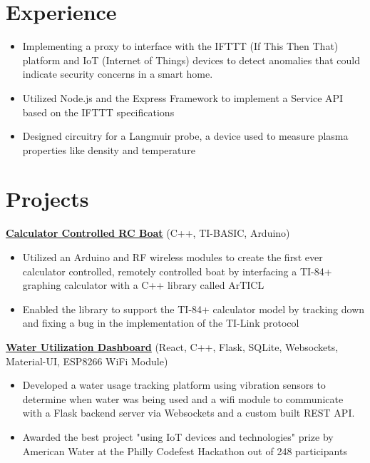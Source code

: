\documentclass{article}
\begin{document}
\section{Experience}
\begin{itemize}
    \item Implementing a proxy to interface with the IFTTT (If This Then That) platform and IoT (Internet of Things) devices to detect anomalies that could indicate security concerns in a smart home.
    \item Utilized Node.js and the Express Framework to implement a Service API based on the IFTTT specifications
\end{itemize}
\begin{itemize}
    \item Designed circuitry for a Langmuir probe, a device used to measure plasma properties like density and temperature
\end{itemize}

\section{Projects}

\textbf{\href{https://github.com/jshin313/CalcControlledBoat}{\underline{Calculator Controlled RC Boat}}} \hfill (C++, TI-BASIC, Arduino)
\begin{itemize}
    \item Utilized an Arduino and RF wireless modules to create the first ever calculator controlled, remotely controlled boat by interfacing a TI-84+ graphing calculator with a C++ library called ArTICL
    \item Enabled the library to support the TI-84+ calculator model by tracking down and fixing a bug in the implementation of the TI-Link protocol
\end{itemize}

\textbf{\href{https://github.com/jshin313/AquaQuant}{\underline{Water Utilization Dashboard}}} \hfill (React, C++, Flask, SQLite, Websockets, Material-UI, ESP8266 WiFi Module)
\begin{itemize}
    \item Developed a water usage tracking platform using vibration sensors to determine when water was being used and a wifi module to communicate with a Flask backend server via Websockets and a custom built REST API.
    \item Awarded the best project "using IoT devices and technologies" prize by American Water at the Philly Codefest Hackathon out of 248 participants
\end{itemize}
\end{document}
